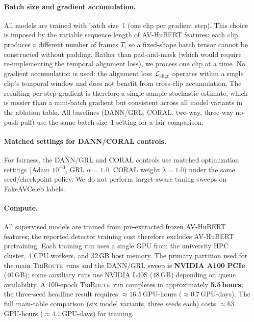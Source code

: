 \documentclass{article}
\newcommand{\method}{\textsc{TriRoute}}
\begin{document}
\paragraph{Batch size and gradient accumulation.}
All models are trained with batch size~1 (one clip per gradient step). This choice is imposed by the variable sequence length of AV-HuBERT features: each clip produces a different number of frames $T$, so a fixed-shape batch tensor cannot be constructed without padding. Rather than pad-and-mask (which would require re-implementing the temporal alignment loss), we process one clip at a time. No gradient accumulation is used: the alignment loss $\mathcal{L}_{\mathrm{align}}$ operates within a single clip's temporal window and does not benefit from cross-clip accumulation. The resulting per-step gradient is therefore a single-sample stochastic estimate, which is noisier than a mini-batch gradient but consistent across all model variants in the ablation table. All baselines (DANN/GRL, CORAL, two-way, three-way no push-pull) use the same batch size~1 setting for a fair comparison.

\paragraph{Matched settings for DANN/CORAL controls.}
For fairness, the DANN/GRL and CORAL controls use matched optimization settings (Adam $10^{-3}$, GRL $\alpha{=}1.0$, CORAL weight $\lambda{=}1.0$) under the same seed/checkpoint policy. We do not perform target-aware tuning sweeps on FakeAVCeleb labels.

\paragraph{Compute.}
All supervised models are trained from pre-extracted frozen AV-HuBERT features; the reported detector training cost therefore excludes AV-HuBERT pretraining. Each training run uses a single GPU from the university HPC cluster, 4 CPU workers, and 32\,GB host memory. The primary partition used for the main \method\ runs and the DANN/GRL sweep is \textbf{NVIDIA A100 PCIe} (40\,GB); some auxiliary runs use NVIDIA L40S (48\,GB) depending on queue availability. A 100-epoch \method\ run completes in approximately \textbf{5.5\,hours}; the three-seed headline result requires ${\approx}16.5$\,GPU-hours (${\approx}0.7$\,GPU-days). The full main-table comparison (six model variants, three seeds each) costs ${\approx}63$\,GPU-hours (${\approx}4.1$\,GPU-days) for training.
\end{document}
